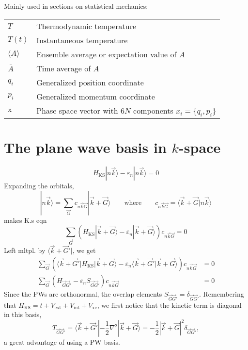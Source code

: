 \documentclass[11pt,bibliography=totoc,index=totoc]{scrbook}   %
\begin{document}
  Mainly used in sections on statistical mechanics:
  
  \begin{tabular}{ll}
    $T$     & Thermodynamic temperature \\
    $T(t)$  & Instantaneous temperature \\
    $\langle A \rangle$ & Ensemble average or expectation value of $A$\\
    $\bar{A}$ & Time average of $A$ \\
    $q_i$   & Generalized position coordinate \\
    $p_i$   & Generalized momentum coordinate \\
    $\mathrm{x}$ & Phase space vector with $6N$ components $x_i=\{q_i,p_i\}$
  \end{tabular}

\chapter{The plane wave basis in $k$-space}\label{app:pwbasis}

\begin{equation}
    H_{\text{KS}} |n\vec{k}\rangle - \varepsilon_n|n\vec{k}\rangle = 0
\end{equation}
Expanding the orbitals,
\begin{equation}
    |n\vec{k}\rangle = \sum_{\vec{G}} c_{n\vec{k}\vec{G}} |\vec{k}+\vec{G}\rangle\qquad\text{where}\qquad c_{n\vec{k}\vec{G}} = \langle \vec{k}+\vec{G}|n\vec{k}\rangle
\end{equation}
makes K.s eqn
\begin{equation}
  \sum_{\vec{G}} \left(H_{\text{KS}} |\vec{k}+\vec{G}\rangle - \varepsilon_n |\vec{k}+\vec{G}\rangle \right) c_{n\vec{k}\vec{G}} = 0
\end{equation}
Left mltpl. by $\langle \vec{k}+\vec{G}'|$, we get
\begin{align}
    \sum_{\vec{G}} \left( \langle \vec{k}+\vec{G}'| H_{\text{KS}} |\vec{k}+\vec{G}\rangle - \varepsilon_n \langle \vec{k}+\vec{G}'|\vec{k}+\vec{G}\rangle \right)c_{n\vec{k}\vec{G}} &= 0 \\
    \sum_{\vec{G}} \left( H_{\vec{G}\vec{G}'} - \varepsilon_n S_{\vec{G}\vec{G}'} \right)c_{n\vec{k}\vec{G}} &= 0
\end{align}
Since the PWs are orthonormal, the overlap elements $S_{\vec{G}\vec{G}'} = \delta_{\vec{G}\vec{G}'}$.
Remembering that $H_{\text{KS}} = t + V_{\text{ext}} + V_{\text{int}} + V_{\text{xc}}$,
we first notice that the kinetic term is diagonal in this basis,
\begin{equation}
    T_{\vec{G}\vec{G}'} = \langle \vec{k}+\vec{G}'| -\frac12\nabla^2 |\vec{k}+\vec{G}\rangle = -\frac12|\vec{k}+\vec{G}|^2 \delta_{\vec{G}\vec{G}'},
\end{equation}
a great advantage of using a PW basis.
\end{document}
